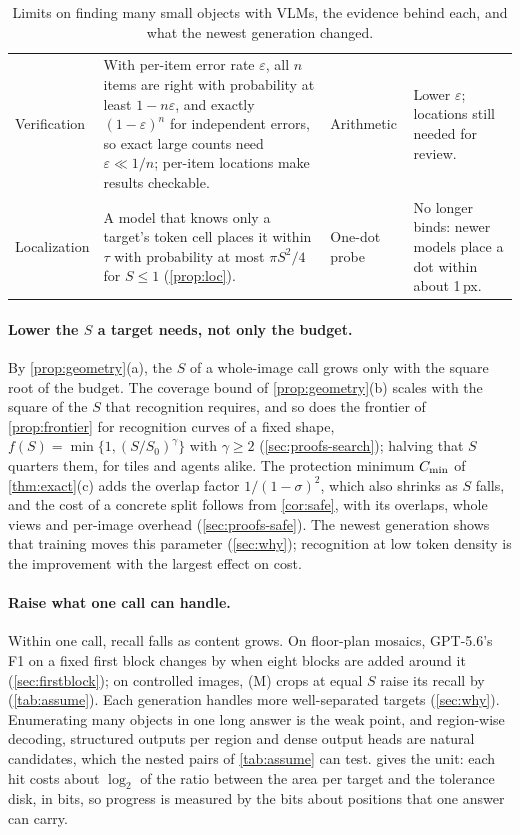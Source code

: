 \begin{table}[t]
\begin{tabular}{p{2.1cm}p{5.8cm}p{2.6cm}p{3.8cm}}
Verification & With per-item error rate $\varepsilon$, all $n$ items are right with probability at least $1 - n\varepsilon$, and exactly $(1-\varepsilon)^n$ for independent errors, so exact large counts need $\varepsilon \ll 1/n$; per-item locations make results checkable. & Arithmetic & Lower $\varepsilon$; locations still needed for review. \\
Localization & A model that knows only a target's token cell places it within $\tau$ with probability at most $\pi S^2/4$ for $S \le 1$ (\cref{prop:loc}). & One-dot probe & No longer binds: newer models place a dot within about 1\,px. \\
\bottomrule
\end{tabular}
\caption{Limits on finding many small objects with VLMs, the evidence behind each, and what the newest generation changed.}
\label{tab:limits}
\end{table}

\paragraph{Lower the $S$ a target needs, not only the budget.} By \cref{prop:geometry}(a), the $S$ of a whole-image call grows only with the square root of the budget. The coverage bound of \cref{prop:geometry}(b) scales with the square of the $S$ that recognition requires, and so does the frontier of \cref{prop:frontier} for recognition curves of a fixed shape, $f(S) = \min\{1, (S/S_0)^\gamma\}$ with $\gamma \ge 2$ (\cref{sec:proofs-search}); halving that $S$ quarters them, for tiles and agents alike. The protection minimum $C_{\min}$ of \cref{thm:exact}(c) adds the overlap factor $1/(1-\sigma)^2$, which also shrinks as $S$ falls, and the cost of a concrete split follows from \cref{cor:safe}, with its overlaps, whole views and per-image overhead (\cref{sec:proofs-safe}). The newest generation shows that training moves this parameter (\cref{sec:why}); recognition at low token density is the improvement with the largest effect on cost.

\paragraph{Raise what one call can handle.} Within one call, recall falls as content grows. On floor-plan mosaics, GPT-5.6's F1 on a fixed first block changes by \XfBKDAOnegptFiveSix{} when eight blocks are added around it (\cref{sec:firstblock}); on controlled images, (M) crops at equal $S$ raise its recall by \XasMGptFiveSix{} (\cref{tab:assume}). Each generation handles more well-separated targets (\cref{sec:why}). Enumerating many objects in one long answer is the weak point, and region-wise decoding, structured outputs per region and dense output heads are natural candidates, which the nested pairs of \cref{tab:assume} can test.  gives the unit: each hit costs about $\log_2$ of the ratio between the area per target and the tolerance disk, in bits, so progress is measured by the bits about positions that one answer can carry.

